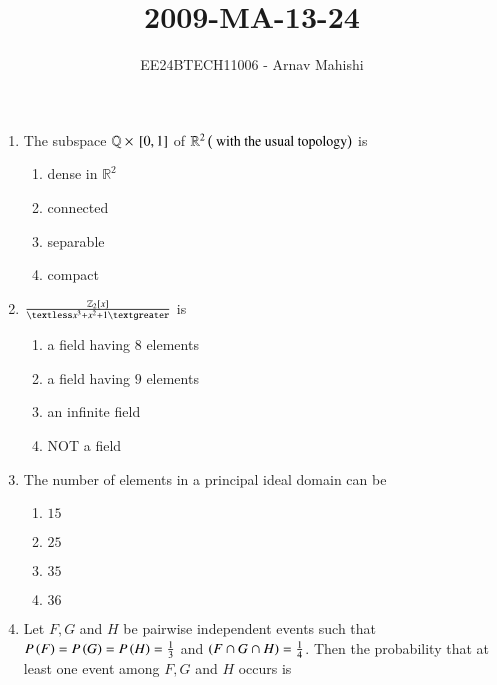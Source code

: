 \documentclass[journal]{IEEEtran}
\begin{document}

\vspace{3cm}

\title{2009-MA-13-24}
\author{EE24BTECH11006 - Arnav Mahishi}
{\let\newpage\relax\maketitle}
\begin{enumerate}
\item{
The subspace $\mathbb{Q}\times{}\left[0,1\right]$ of $\mathbb{R}^2\left(\text{ with the usual topology}\right)$ is 
\begin{multicols}{4}
\begin{enumerate}
\item dense in $\mathbb{R}^2$
\item connected
\item separable 
\item compact
\end{enumerate}
\end{multicols}
}
\item{
$\frac{\mathbb{Z}_2\sbrak{x}}{\textless x^3+x^2+1\textgreater}$ is
\begin{multicols}{2}
\begin{enumerate}
\item a field having $8$ elements 
\item a field having $9$ elements 
\item an infinite field
\item NOT a field
\end{enumerate}
\end{multicols}}
\item{
The number of elements in a principal ideal domain can be
\begin{multicols}{4}
\begin{enumerate}
\item $15$
\item $25$
\item $35$
\item $36$
\end{enumerate}
\end{multicols}
}
\item{
Let $F,G$ and $H$ be pairwise independent events such that $P\left(F\right)=P\left(G\right)=P\left(H\right)=\frac{1}{3}$ and $\left(F\cap G\cap H\right)=\frac{1}{4}$. Then the probability that at least one event among $F,G$ and $H$ occurs is
}
\end{enumerate}
\end{document}
